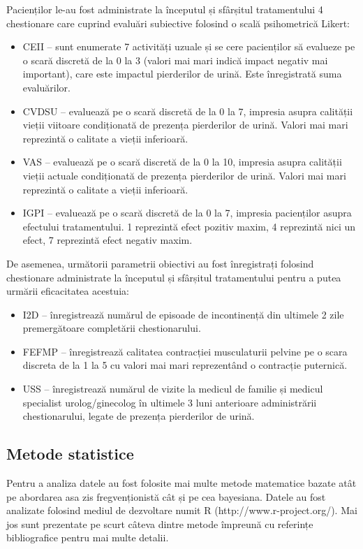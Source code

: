 \documentclass[12pt,draft]{article}
\begin{document}
  Pacienților le-au fost administrate la începutul și sfârșitul tratamentului 4 chestionare care cuprind evaluări subiective folosind o scală psihometrică Likert:
  \begin{itemize}
    \item \ac{CEII} -- sunt enumerate 7 activități uzuale și se cere pacienților să evalueze pe o scară discretă de la 0 la 3 (valori mai mari indică impact negativ mai important), care este impactul pierderilor de urină. Este înregistrată suma evaluărilor.
    \item \ac{CVDSU} -- evaluează pe o scară discretă de la 0 la 7, impresia asupra calității vieții viitoare condiționată de prezența pierderilor de urină. Valori mai mari reprezintă o calitate a vieții inferioară.
    \item \ac{VAS} -- evaluează pe o scară discretă de la 0 la 10, impresia asupra calității vieții actuale condiționată de prezența pierderilor de urină. Valori mai mari reprezintă o calitate a vieții inferioară.
    \item \ac{IGPI} -- evaluează pe o scară discretă de la 0 la 7, impresia pacienților asupra efectului tratamentului. 1 reprezintă efect pozitiv maxim, 4 reprezintă nici un efect, 7 reprezintă efect negativ maxim.
  \end{itemize}
  De asemenea, următorii parametrii obiectivi au fost înregistrați folosind chestionare administrate la începutul și sfârșitul tratamentului pentru a putea urmării eficacitatea acestuia:
  \begin{itemize}
    \item I2D -- înregistrează numărul de episoade de incontinență din ultimele 2 zile premergătoare completării chestionarului. 
    \item \ac{FEFMP} -- înregistrează calitatea contracției musculaturii pelvine pe o scara discreta de la 1 la 5 cu valori mai mari reprezentând o contracție puternică. 
    \item \ac{USS} -- înregistrează numărul de vizite la medicul de familie și medicul specialist urolog/ginecolog în ultimele 3 luni anterioare administrării chestionarului, legate de prezența pierderilor de urină.
  \end{itemize}

\subsection{Metode statistice}
  Pentru a analiza datele au fost folosite mai multe metode matematice bazate atât pe abordarea asa zis fregvenționistă cât și pe cea bayesiana. Datele au fost analizate folosind mediul de dezvoltare numit R (http://www.r-project.org/). Mai jos sunt prezentate pe scurt câteva dintre metode împreună cu referințe bibliografice pentru mai multe detalii.
\end{document}
